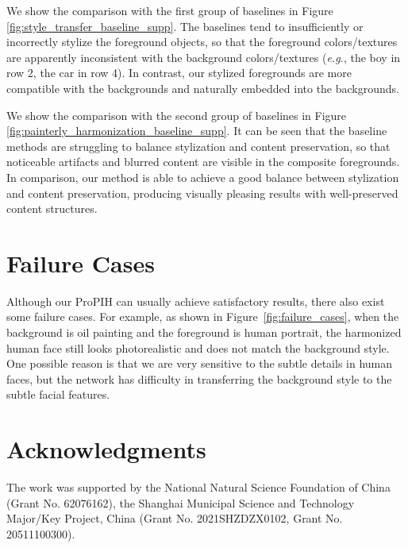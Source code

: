 \documentclass[letterpaper]{article} %
\begin{document}
We show the comparison with the first group of baselines in Figure \ref{fig:style_transfer_baseline_supp}. The baselines tend to insufficiently or incorrectly stylize the foreground objects, so that the foreground colors/textures are apparently inconsistent with the background colors/textures (\emph{e.g.}, the boy in row 2, the car in row 4). In contrast, our stylized foregrounds are more compatible with the backgrounds and naturally embedded into the backgrounds.

We show the comparison with the second group of baselines in Figure \ref{fig:painterly_harmonization_baseline_supp}. It can be seen that the baseline methods are struggling to balance stylization and content preservation, so that noticeable artifacts and blurred content are visible in the composite foregrounds. In comparison, our method is able to achieve a good balance between stylization and content preservation, producing visually pleasing results with well-preserved content structures. 


\section{Failure Cases} \label{sec:failure_case}

Although our ProPIH can usually achieve satisfactory results, there also exist some failure cases. For example, as shown in Figure~\ref{fig:failure_cases}, when the background is oil painting and the foreground is human portrait, the harmonized human face still looks photorealistic and does not match the background style. One possible reason is that we are very sensitive to the subtle details in human faces, but the network has difficulty in transferring the background style to the subtle facial features. 


\section*{Acknowledgments}
The work was supported by the National Natural Science Foundation of China (Grant No. 62076162), the Shanghai Municipal Science and Technology Major/Key Project, China (Grant No. 2021SHZDZX0102, Grant No. 20511100300).  



\end{document}
